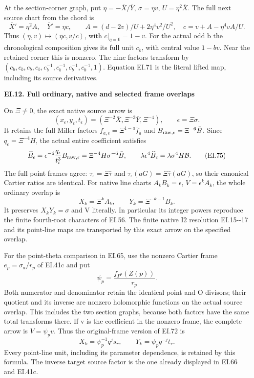 At the section-corner graph, put \(\eta=-\bar X/\bar Y\),
\(\sigma=\eta v\), \(U=\eta^2\bar X\). The full next source
chart from the chord is
\[
 \bar X'=\eta^2 A,\quad \bar Y'=\eta c,\qquad
 A=(d-2v)/U+2\eta^4v^2/U^2,\quad
 c=v+A-\eta^4vA/U.
 \tag{EI.73}
\]
Thus \((\eta,v)\mapsto(\eta c,v/c)\), with
\(c|_{\eta=0}=1-v\). For the actual odd b the chronological
composition gives its full unit \(c_b\), with central value
\(1-bv\). Near the retained corner this is nonzero. The nine
factors transform by \((c_b,c_b,c_b,c_b,
c_b^{-1},c_b^{-1},c_b^{-1},c_b^{-1},1)\). Equation EI.71
is the literal lifted map, including its source derivatives.

\par

\medskip\noindent\textbf{EI.12. Full ordinary, native and selected frame overlaps}

\par\nobreak

On \(\Xi\ne0\), the exact native source arrow is
\[
 (x_\epsilon,y_\epsilon,t_\epsilon)
   =(\Xi^{-2}\bar X,\Xi^{-3}\bar Y,\Xi^{-4}),
 \qquad \epsilon=\Xi\sigma.
 \tag{EI.74}
\]
It retains the full Miller factors
\(f_{a,\epsilon}=\Xi^{1-a}\bar f_a\) and
\(B_{{\rm raw},\epsilon}=\Xi^{-6}\bar B\).
Since \(q_\epsilon=\Xi^{-4}H\), the actual entire coefficient
satisfies
\[
 \widehat B_\epsilon
 =\epsilon^{-6}\frac{q_\epsilon}{t_\epsilon^3}
                     B_{{\rm raw},\epsilon}
 =\Xi^{-4}H\sigma^{-6}\bar B,\qquad
 \lambda\epsilon^4\widehat B_\epsilon
 =\lambda\sigma^4H\mathcal B.
 \tag{EI.75}
\]
The full point frames agree: \(\tau_\epsilon=\Xi\bar\tau\)
and \(\tau_\epsilon(aG)=\Xi\bar\tau(aG)\), so their
canonical Cartier ratios are identical. For native line charts
\(A_kB_k=\epsilon\), \(V=\epsilon^kA_k\), the whole ordinary
overlap is
\[
 X_k=\Xi^kA_k,\qquad
 Y_k=\Xi^{-k-1}B_k.
 \tag{EI.76}
\]
It preserves \(X_kY_k=\sigma\) and V literally. In particular
its integer powers reproduce the finite fourth-root characters
of EI.56. The finite native I2 resolution EI.15-\/-17 and its
point-line maps are transported by this exact arrow on the
specified overlap.

For the point-theta comparison in EI.65, use the nonzero
Cartier frame \(e_p=\sigma_a/r_p\) of EI.41c and put
\[
 \psi_p=\frac{f_{P^a}(Z(p))}{r_p}.
 \tag{EI.77}
\]
Both numerator and denominator retain the identical point and
O divisors; their quotient and its inverse are nonzero
holomorphic functions on the actual source overlap. This
includes the two section graphs, because both factors have
the same total transforms there. If v is the coefficient in
the nonzero frame, the complete arrow is \(V=\psi_p v\).
Thus the original-frame version of EI.72 is
\[
 X_k=\psi_p^{-1}q^js_r,\qquad
 Y_k=\psi_p q^{-j}t_r.
 \tag{EI.78}
\]
Every point-line unit, including its parameter dependence,
is retained by this formula. The inverse target source
factor is the one already displayed in EI.66 and EI.41c.

